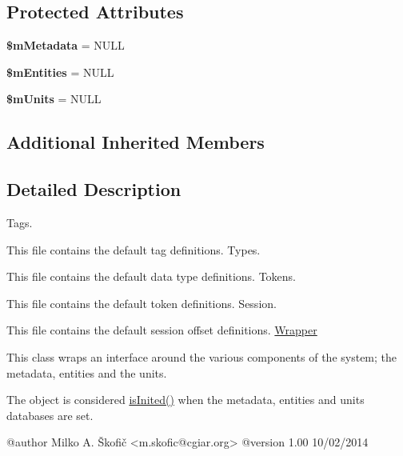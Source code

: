 \subsection*{Protected Attributes}
\begin{DoxyCompactItemize}
\item 
\hypertarget{class_ontology_wrapper_1_1_wrapper_a948081a4198321507da5b8e12976c606}{{\bfseries \$m\-Metadata} = N\-U\-L\-L}\label{class_ontology_wrapper_1_1_wrapper_a948081a4198321507da5b8e12976c606}

\item 
\hypertarget{class_ontology_wrapper_1_1_wrapper_afdfce5944ab839404cad14a166f7713b}{{\bfseries \$m\-Entities} = N\-U\-L\-L}\label{class_ontology_wrapper_1_1_wrapper_afdfce5944ab839404cad14a166f7713b}

\item 
\hypertarget{class_ontology_wrapper_1_1_wrapper_a7b23eb25ac51ad80722f7f8677e92202}{{\bfseries \$m\-Units} = N\-U\-L\-L}\label{class_ontology_wrapper_1_1_wrapper_a7b23eb25ac51ad80722f7f8677e92202}

\end{DoxyCompactItemize}
\subsection*{Additional Inherited Members}


\subsection{Detailed Description}
Tags.

This file contains the default tag definitions. Types.

This file contains the default data type definitions. Tokens.

This file contains the default token definitions. Session.

This file contains the default session offset definitions. \hyperlink{class_ontology_wrapper_1_1_wrapper}{Wrapper}

This class wraps an interface around the various components of the system; the metadata, entities and the units.

The object is considered \hyperlink{namespace_ontology_wrapper_a7c06300cb0043d3bab108f92cb9be3db}{is\-Inited()} when the metadata, entities and units databases are set. \begin{DoxyVerb} @author            Milko A. Škofič <m.skofic@cgiar.org>
 @version   1.00 10/02/2014\end{DoxyVerb}
 

